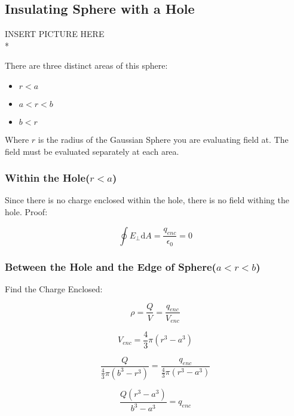 \documentclass[a4paper,12pt]{article}
\begin{document}
				\subsection{Insulating Sphere with a Hole}
					INSERT PICTURE HERE\\*

					There are three distinct areas of this sphere:
					\begin{itemize}
							\item $r < a$
							\item $a < r < b$
							\item $b < r$
					\end{itemize}

					Where $r$ is the radius of the Gaussian Sphere you are evaluating field at. The field must be evaluated separately at each area.
					\subsubsection{Within the Hole($r < a$)}
						Since there is no charge enclosed within the hole, there is no field withing the hole. Proof:

						\begin{equation*}
							\oint E_{\bot} \mathrm{d}A = \frac{q_{enc}}{\epsilon_{0}} = 0
						\end{equation*}

					\subsubsection{Between the Hole and the Edge of Sphere($a < r < b$)}

						Find the Charge Enclosed:

						\begin{equation*}
								\rho = \frac{Q}{V} = \frac{q_{enc}}{V_{enc}}
						\end{equation*}

						\begin{equation*}
								V_{enc} = \frac{4}{3} \pi (r^{3} - a^{3}) 
						\end{equation*}

						\begin{equation*}
								\frac{Q}{\frac{4}{3} \pi (b^{3} - r^{3})} = \frac{q_{enc}}{\frac{4}{3} \pi (r^{3} - a^{3})} 
						\end{equation*}

						\begin{equation*}
								\frac{Q(r^{3} - a^{3})}{b^{3} - a^{3}} = q_{enc}
						\end{equation*}
\end{document}
